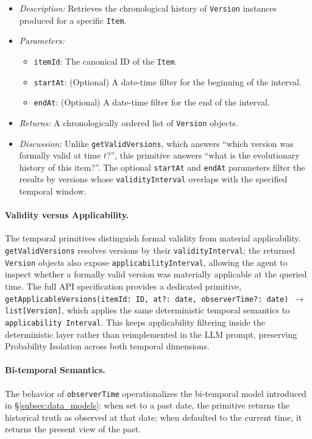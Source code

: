 \documentclass[11pt]{article}
\begin{document}
\begin{itemize}
    \item \textit{Description:} Retrieves the  chronological history of \texttt{Version} instances produced for a specific \texttt{Item}.
    \item \textit{Parameters:}
    \begin{itemize}
        \item \texttt{itemId}: The canonical ID of the \texttt{Item}.
        \item \texttt{startAt}: (Optional) A date-time filter for the beginning of the interval.
        \item \texttt{endAt}: (Optional) A date-time filter for the end of the interval.
    \end{itemize}
    \item \textit{Returns:} A chronologically ordered list of \texttt{Version} objects.
    \item \textit{Discussion:} Unlike \texttt{getValidVersions}, which answers ``which version was formally valid at time $t$?'', this primitive answers ``what is the evolutionary history of this item?''. The optional \texttt{startAt} and \texttt{endAt} parameters filter the results by versions whose \texttt{validityInterval} overlaps with the specified temporal window.
\end{itemize}

\paragraph{Validity versus Applicability.}
The temporal primitives distinguish formal validity from material applicability. \texttt{getValidVersions} resolves versions by their \texttt{validityInterval}; the returned \texttt{Version} objects also expose \texttt{applicabilityInterval}, allowing the agent to inspect whether a formally valid version was materially applicable at the queried time. The full API specification provides a dedicated primitive, \texttt{getApplicableVersions(itemId: ID, at?: date, observerTime?: date) $\rightarrow$ list[Version]}, which applies the same deterministic temporal semantics to \texttt{applicability Interval}. This keeps applicability filtering inside the deterministic layer rather than reimplemented in the LLM prompt, preserving Probability Isolation across both temporal dimensions.

\paragraph{Bi-temporal Semantics.}
The behavior of \texttt{observerTime} operationalizes the bi-temporal model introduced in \S\ref{subsec:data_models}: when set to a past date, the primitive returns the historical truth as observed at that date; when defaulted to the current time, it returns the present view of the past.
\end{document}
